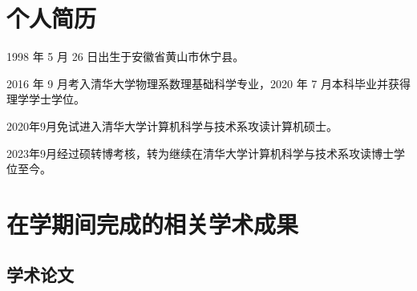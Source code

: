 
\begin{resume}

  \section*{个人简历}

  1998 年 5 月 26 日出生于安徽省黄山市休宁县。

  2016 年 9 月考入清华大学物理系数理基础科学专业，2020 年 7 月本科毕业并获得理学学士学位。

  2020年9月免试进入清华大学计算机科学与技术系攻读计算机硕士。

  2023年9月经过硕转博考核，转为继续在清华大学计算机科学与技术系攻读博士学位至今。


  \section*{在学期间完成的相关学术成果}

  \subsection*{学术论文}

  \begin{achievements}
      

\end{achievements}
\end{resume}
